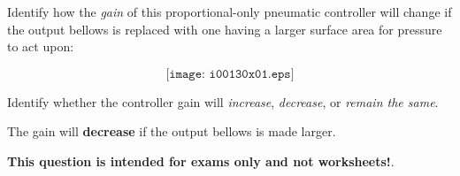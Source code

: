 

Identify how the {\it gain} of this proportional-only pneumatic controller will change if the output bellows is replaced with one having a larger surface area for pressure to act upon:

$$\texttt{[image: i00130x01.eps]}$$

Identify whether the controller gain will {\it increase}, {\it decrease}, or {\it remain the same}.

\vskip 30pt







The gain will {\bf decrease} if the output bellows is made larger.







{\bf This question is intended for exams only and not worksheets!}.



